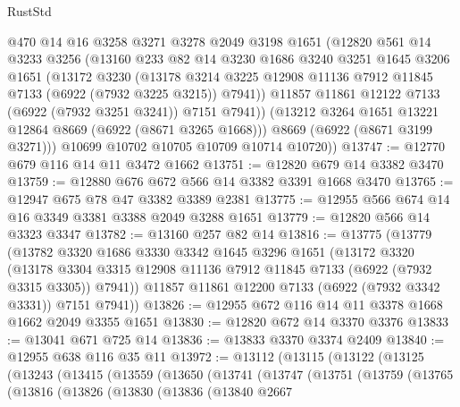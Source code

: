 \begin{lexlean}{RustStd}
\begin{coremodule}
          @470
          @14
          @16
          @3258
          @3271
          @3278
          @2049
          @3198
          @1651
          (@12820
            @561
            @14
            @3233
            @3256
            (@13160
              @233
              @82
              @14
              @3230
              @1686
              @3240
              @3251
              @1645
              @3206
              @1651
              (@13172
                @3230
                (@13178
                  @3214
                  @3225
                  @12908
                  @11136
                  @7912
                  @11845
                  @7133
                  (@6922 (@7932 @3225 @3215))
                  @7941))
              @11857
              @11861
              @12122
              @7133
              (@6922 (@7932 @3251 @3241))
              @7151
              @7941))
          (@13212 @3264 @1651 @13221 @12864 @8669 (@6922 (@8671 @3265 @1668)))
          @8669
          (@6922 (@8671 @3199 @3271)))
        @10699
        @10702
        @10705
        @10709
        @10714
        @10720))
@13747 := @12770 @679 @116 @14 @11 @3472 @1662
@13751 := @12820 @679 @14 @3382 @3470
@13759 := @12880 @676 @672 @566 @14 @3382 @3391 @1668 @3470
@13765 := @12947 @675 @78 @47 @3382 @3389 @2381
@13775 := @12955 @566 @674 @14 @16 @3349 @3381 @3388 @2049 @3288 @1651
@13779 := @12820 @566 @14 @3323 @3347
@13782 := @13160 @257 @82 @14
@13816 := @13775
    (@13779
      (@13782
        @3320
        @1686
        @3330
        @3342
        @1645
        @3296
        @1651
        (@13172
          @3320
          (@13178 @3304 @3315 @12908 @11136 @7912 @11845 @7133 (@6922 (@7932 @3315 @3305)) @7941))
        @11857
        @11861
        @12200
        @7133
        (@6922 (@7932 @3342 @3331))
        @7151
        @7941))
@13826 := @12955 @672 @116 @14 @11 @3378 @1668 @1662 @2049 @3355 @1651
@13830 := @12820 @672 @14 @3370 @3376
@13833 := @13041 @671 @725 @14
@13836 := @13833 @3370 @3374 @2409
@13840 := @12955 @638 @116 @35 @11
@13972 := @13112
    (@13115
      (@13122
        (@13125
          (@13243
            (@13415
              (@13559
                (@13650
                  (@13741
                    (@13747
                      (@13751
                        (@13759
                          (@13765
                            (@13816
                              (@13826
                                (@13830
                                  (@13836
                                    (@13840
                                      @2667

\end{coremodule}
\end{lexlean}
